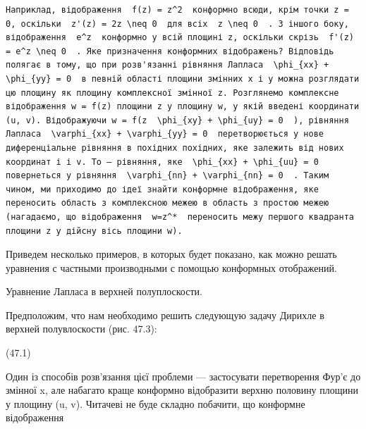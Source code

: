 \documentclass[
  ukrainian,
]{article}
\begin{document}
\begin{verbatim}
Наприклад, відображення  f(z) = z^2  конформно всюди, крім точки z = 0, оскільки  z'(z) = 2z \neq 0  для всіх  z \neq 0  . З іншого боку, відображення  e^z  конформно у всій площині z, оскільки скрізь  f'(z) = e^z \neq 0  . Яке призначення конформних відображень? Відповідь полягає в тому, що при розв'язанні рівняння Лапласа  \phi_{xx} + \phi_{yy} = 0  в певній області площини змінних x і y можна розглядати цю площину як площину комплексної змінної z. Розглянемо комплексне відображення w = f(z) площини z у площину w, у якій введені координати (u, v). Відображуючи w = f(z  \phi_{xy} + \phi_{uy} = 0  ), рівняння Лапласа  \varphi_{xx} + \varphi_{yy} = 0  перетворюється у нове диференціальне рівняння в похідних похідних, яке залежить від нових координат і і v. To — рівняння, яке  \phi_{xx} + \phi_{uu} = 0  повернеться у рівняння  \varphi_{nn} + \varphi_{nn} = 0  . Таким чином, ми приходимо до ідеї знайти конформне відображення, яке переносить область з комплексною межею в область з простою межею (нагадаємо, що відображення  w=z^*  переносить межу першого квадранта площини z у дійсну вісь площини w).
\end{verbatim}

Приведем несколько примеров, в которых будет показано, как можно решать
уравнения с частными производными с помощью конформных отображений.

Уравнение Лапласа в верхней полуплоскости.

Предположим, что нам необходимо решить следующую задачу Дирихле в
верхней полувлоскости (рис. 47.3):

(47.1)

Один із способів розв'язання цієї проблеми --- застосувати перетворення
Фур'є до змінної x, але набагато краще конформно відобразити верхню
половину площини у площину (u, v). Читачеві не буде складно побачити, що
конформне відображення
\end{document}
